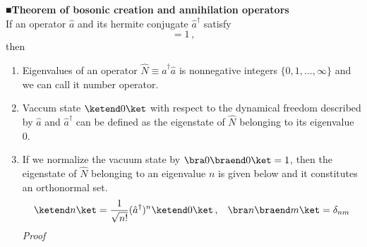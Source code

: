 \bigskip
\noindent
{\bf ■Theorem of bosonic creation and annihilation operators}\cite{ref:Takahashi_bussei1}\\
If an operator $\hat{a}$ and its hermite conjugate $\hat{a}^\dagger$ satisfy
\begin{equation}
[\hat{a}, \hat{a}^\dagger] = 1\,,
\label{eqn:boson_commutation_relation}
\end{equation}
then
\begin{enumerate}
\item Eigenvalues of an operator $\hat{N} \equiv \hat{a}^\dagger \hat{a}$ is
nonnegative integers $\{0,1,\dots,\infty\}$ and we can call it number operator.
\item Vaccum state $\ketend 0 \ket$ with respect to the dynamical freedom described by $\hat{a}$
and $\hat{a}^\dagger$ can be defined as the eigenstate of
$\hat{N}$ belonging to its eigenvalue 0.
\item
If we normalize the vacuum state by $\bra 0 \braend 0 \ket = 1$, then the eigenstate
of $\hat{N}$ belonging to an eigenvalue $n$ is given below and 
it constitutes an orthonormal set.
\begin{equation}
\ketend n \ket = \frac{1}{\sqrt{n!}} (\hat{a}^\dagger )^n \ketend  0 \ket \,,
\hspace{3mm}
\bra n \braend m \ket = \delta_{nm}
\label{eqn:nbosonstate}
\end{equation}
{\it Proof}


\end{enumerate}
